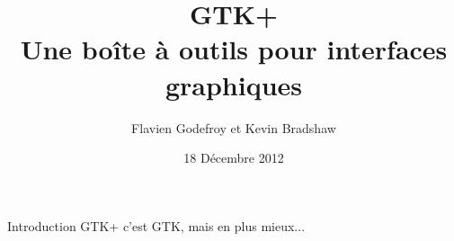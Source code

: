 \documentclass{beamer}
\title[GTK+]{GTK+\\Une boîte à outils pour interfaces graphiques}
\author{Flavien Godefroy et Kevin Bradshaw}
\date{18 Décembre 2012}
\begin{document}
\begin{frame}
\titlepage
\end{frame}


\begin{frame}{Introduction}
GTK+ c'est GTK, mais en plus mieux...
\end{frame}
\end{document}
